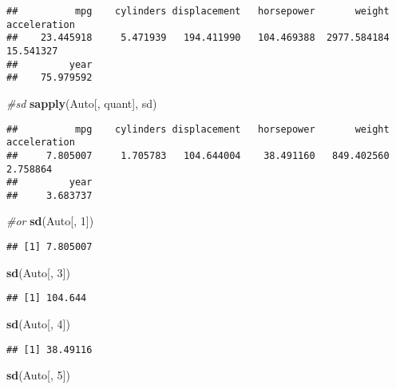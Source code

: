 \documentclass[
]{article}
\newenvironment{Shaded}{\begin{snugshade}}{\end{snugshade}}
\newcommand{\CommentTok}[1]{\textcolor[rgb]{0.56,0.35,0.01}{\textit{#1}}}
\newcommand{\DecValTok}[1]{\textcolor[rgb]{0.00,0.00,0.81}{#1}}
\newcommand{\FunctionTok}[1]{\textcolor[rgb]{0.13,0.29,0.53}{\textbf{#1}}}
\newcommand{\NormalTok}[1]{#1}
\begin{document}
\begin{verbatim}
##          mpg    cylinders displacement   horsepower       weight acceleration 
##    23.445918     5.471939   194.411990   104.469388  2977.584184    15.541327 
##         year 
##    75.979592
\end{verbatim}

\begin{Shaded}
\begin{Highlighting}[]
\CommentTok{\#sd}
\FunctionTok{sapply}\NormalTok{(Auto[, quant], sd)}
\end{Highlighting}
\end{Shaded}

\begin{verbatim}
##          mpg    cylinders displacement   horsepower       weight acceleration 
##     7.805007     1.705783   104.644004    38.491160   849.402560     2.758864 
##         year 
##     3.683737
\end{verbatim}

\begin{Shaded}
\begin{Highlighting}[]
\CommentTok{\#or}
\FunctionTok{sd}\NormalTok{(Auto[, }\DecValTok{1}\NormalTok{])}
\end{Highlighting}
\end{Shaded}

\begin{verbatim}
## [1] 7.805007
\end{verbatim}

\begin{Shaded}
\begin{Highlighting}[]
\FunctionTok{sd}\NormalTok{(Auto[, }\DecValTok{3}\NormalTok{])}
\end{Highlighting}
\end{Shaded}

\begin{verbatim}
## [1] 104.644
\end{verbatim}

\begin{Shaded}
\begin{Highlighting}[]
\FunctionTok{sd}\NormalTok{(Auto[, }\DecValTok{4}\NormalTok{])}
\end{Highlighting}
\end{Shaded}

\begin{verbatim}
## [1] 38.49116
\end{verbatim}

\begin{Shaded}
\begin{Highlighting}[]
\FunctionTok{sd}\NormalTok{(Auto[, }\DecValTok{5}\NormalTok{])}
\end{Highlighting}
\end{Shaded}
\end{document}
